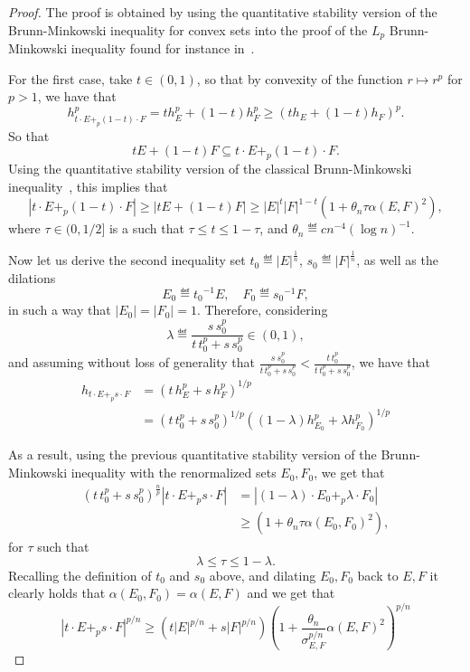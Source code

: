\documentclass[a4paper, 10pt, twoside]{amsart}
\numberwithin{equation}{section}
\theoremstyle{plain}
\theoremstyle{definition}
\begin{document}
\begin{proof}
    The proof is obtained by using the quantitative stability version of the Brunn-Minkowski inequality for convex sets into the proof of the $L_p$ Brunn-Minkowski inequality found for instance in~\cite{boroczky2025isoperimetric}. 

    For the first case, take $t \in (0,1)$, so that by convexity of the function $r \mapsto r^p$ for $p > 1$, we have that 
    \[
        h^p_{t\cdot E +_p (1-t)\cdot F} 
        = 
        t h_E^p + (1-t) h_F^p
        \ge 
        (t h_E + (1-t) h_F)^p. 
    \]
    So that 
    \[
        t E + (1-t) F \subseteq t\cdot E +_p (1-t)\cdot F. 
    \]
    Using the quantitative stability version of the classical Brunn-Minkowski inequality~\cite[Corollary~8.6.5]{boroczky2025isoperimetric}, this implies that 
    \[
        |t\cdot E +_p (1-t)\cdot F|
        \ge 
        |t E + (1-t) F|
        \ge 
        |E|^t|F|^{1-t}
        \left(
            1 + \theta_n \tau \alpha(E,F)^2
        \right),
    \]
    where $\tau \in (0,1/2]$ is a such that $\tau \le t \le 1 - \tau$, and $\theta_n \eqdef cn^{-4}{(\log n)}^{-1}$.  

    Now let us derive the second inequality set $t_0 \eqdef |E|^{\frac{1}{n}}$, $s_0 \eqdef |F|^{\frac{1}{n}}$, as well as the dilations 
    \[
        E_0 \eqdef {t_0}^{-1}E, \quad 
        F_0 \eqdef {s_0}^{-1}F,
    \]
    in such a way that $|E_0| = |F_0| = 1$. Therefore, considering 
    \[
        \lambda \eqdef \frac{s\,s_0^p}{t\,t_0^p + s\,s_0^p} \in (0,1),
    \]
    and assuming without loss of generality that $\frac{s\ s_0^p}{t\,t_0^p + s\,s_0^p} < \frac{t\,t_0^p}{t\,t_0^p + s\,s_0^p}$, we have that 
    \begin{align*}
        h_{t\cdot E +_p s\cdot F}
        &= 
        {\left(
            t\,h_{E}^p + s\,h_{F}^p
        \right)}^{1/p}  \\ 
        &= 
        {\left(
          t\,t_0^p + s\,s_0^p
        \right)}^{1/p} 
        {\left(
            (1-\lambda) h_{E_0}^p +
            \lambda h_{F_0}^p
        \right)}^{1/p}
    \end{align*}

    As a result, using the previous quantitative stability version of the Brunn-Minkowski inequality with the renormalized sets $E_0, F_0$, we get that 
    \begin{align*}
        {(t\,t_0^p + s\,s_0^p)}^{\frac{n}{p}}
        |t\cdot E +_p s\cdot F|
        &= 
        |(1-\lambda)\cdot E_0 +_p \lambda\cdot F_0|\\ 
        &\ge \left(
            1 + \theta_n \tau {\alpha(E_0, F_0)}^2
        \right),
    \end{align*}
    for $\tau$ such that 
    \[
        \lambda \le \tau \le 1-\lambda. 
    \]
    Recalling the definition of $t_0$ and $s_0$ above, and dilating $E_0,F_0$ back to $E,F$ it clearly holds that $\alpha(E_0,F_0) = \alpha(E,F)$ and we get that 
    \[
        {|t\cdot E +_p s\cdot F|}^{p/n} 
        \ge 
        \left(
            t {|E|}^{p/n} + s {|F|}^{p/n}
        \right)
        {\left(
            1 + \frac{\theta_n}{
                \sigma_{E,F}^{p/n}
            } {\alpha(E, F)}^2
        \right)}^{p/n}
    \]
\end{proof}
\end{document}
